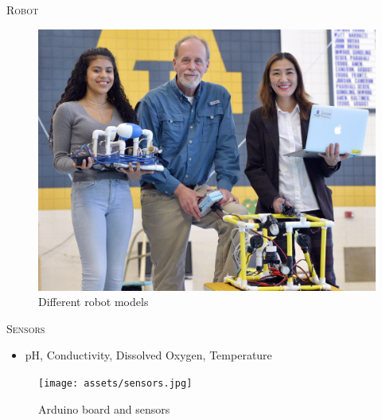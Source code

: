 \documentclass[final,t]{beamer}
\begin{document}
\begin{frame}{}
\begin{columns}[t]
\begin{column}{.5\linewidth}
                \begin{block}{\textsc{Robot}}
                    \vspace*{6mm}
                    \begin{figure}
                        \includegraphics[scale = 0.5]{assets/group_pic.jpg}
                        \caption{Different robot models}
                    \end{figure}
                \end{block}

                \begin{block}{\textsc{Sensors}}
                    \vspace*{6mm}
                    \begin{itemize}
                        \item pH, Conductivity, Dissolved Oxygen, Temperature
                    \end{itemize}
                    \begin{figure}[h!]
                        \texttt{[image: assets/sensors.jpg]}
                        \caption{Arduino board and sensors}
                    \end{figure}
                \end{block}


\end{column}
\end{columns}
\end{frame}
\end{document}
